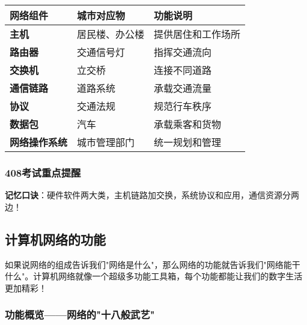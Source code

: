 \documentclass[lang=cn,newtx,10pt,scheme=chinese]{../../elegantbook}
\begin{document}
\begin{longtable}{|p{3cm}|p{5cm}|p{5cm}|}
\hline
\textbf{网络组件} & \textbf{城市对应物} & \textbf{功能说明} \\
\hline
\textbf{主机} & 居民楼、办公楼 & 提供居住和工作场所 \\
\hline
\textbf{路由器} & 交通信号灯 & 指挥交通流向 \\
\hline
\textbf{交换机} & 立交桥 & 连接不同道路 \\
\hline
\textbf{通信链路} & 道路系统 & 承载交通流量 \\
\hline
\textbf{协议} & 交通法规 & 规范行车秩序 \\
\hline
\textbf{数据包} & 汽车 & 承载乘客和货物 \\
\hline
\textbf{网络操作系统} & 城市管理部门 & 统一规划和管理 \\
\hline
\end{longtable}

\subsubsection{408考试重点提醒}

\begin{center}
\end{center}

\textbf{记忆口诀}：硬件软件两大类，主机链路加交换，系统协议和应用，通信资源分两边！

\subsection{计算机网络的功能}

如果说网络的组成告诉我们"网络是什么"，那么网络的功能就告诉我们"网络能干什么"。计算机网络就像一个超级多功能工具箱，每个功能都能让我们的数字生活更加精彩！

\subsubsection{功能概览——网络的"十八般武艺"}
\end{document}
